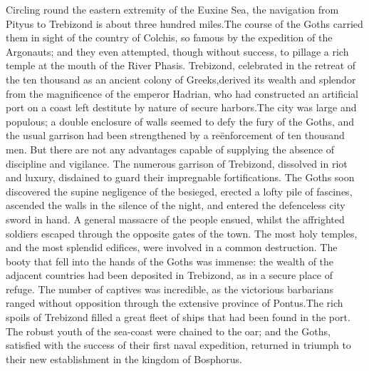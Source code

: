 

Circling round the eastern extremity of the Euxine Sea, the
navigation from Pityus to Trebizond is about three hundred miles.\footnotemark[107]
The course of the Goths carried them in sight of the country
of Colchis, so famous by the expedition of the Argonauts; and
they even attempted, though without success, to pillage a rich
temple at the mouth of the River Phasis. Trebizond, celebrated in
the retreat of the ten thousand as an ancient colony of Greeks,\footnotemark[108]
derived its wealth and splendor from the magnificence of the
emperor Hadrian, who had constructed an artificial port on a
coast left destitute by nature of secure harbors.\footnotemark[109] The city
was large and populous; a double enclosure of walls seemed to
defy the fury of the Goths, and the usual garrison had been
strengthened by a reënforcement of ten thousand men. But there
are not any advantages capable of supplying the absence of
discipline and vigilance. The numerous garrison of Trebizond,
dissolved in riot and luxury, disdained to guard their
impregnable fortifications. The Goths soon discovered the supine
negligence of the besieged, erected a lofty pile of fascines,
ascended the walls in the silence of the night, and entered the
defenceless city sword in hand. A general massacre of the people
ensued, whilst the affrighted soldiers escaped through the
opposite gates of the town. The most holy temples, and the most
splendid edifices, were involved in a common destruction. The
booty that fell into the hands of the Goths was immense: the
wealth of the adjacent countries had been deposited in Trebizond,
as in a secure place of refuge. The number of captives was
incredible, as the victorious barbarians ranged without
opposition through the extensive province of Pontus.\footnotemark[110] The rich
spoils of Trebizond filled a great fleet of ships that had been
found in the port. The robust youth of the sea-coast were chained
to the oar; and the Goths, satisfied with the success of their
first naval expedition, returned in triumph to their new
establishment in the kingdom of Bosphorus.\footnotemark[111]

